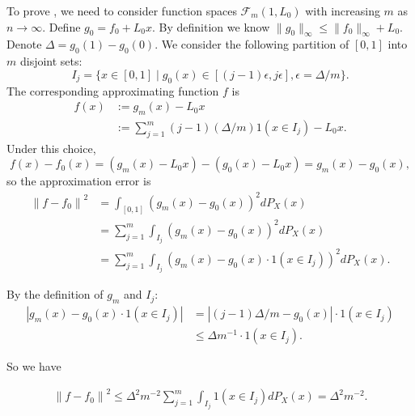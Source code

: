 \documentclass[12pt]{article}
\begin{document}
\begin{appendices}
To prove , we need to consider function spaces $\mathcal{F}_m(1, L_0)$ with increasing $m$ as $n\rightarrow\infty$. Define $g_0 = f_0 + L_0x$. By definition we know $\|g_0\|_\infty \leq \|f_0\|_{\infty} + L_0$. Denote $\Delta = g_{0}(1)-g_{0}(0)$. We consider the following partition of $[0,1]$ into $m$ disjoint sets:
\begin{equation*}
    I_j = \{ x\in[0,1] \mid g_0(x) \in [(j-1) \epsilon, j \epsilon], \epsilon = \Delta/m\}.
\end{equation*}
The corresponding approximating function $f$ is 
\begin{equation*}
\begin{aligned}
    f(x) & := g_m (x) - L_0 x\\
 & := \sum_{j=1}^m(j-1) (\Delta/m) 1\left(x \in I_j\right) - L_0 x .
\end{aligned}
\end{equation*}
Under this choice, 
\begin{equation*}
    f(x) - f_0(x) = (g_m(x) - L_0 x) - (g_0(x) - L_0 x) = g_m(x) - g_0(x),
\end{equation*}
so the approximation error is
\begin{equation*}
    \begin{aligned}
        \left\|f-f_0\right\|^2 &= \int_{[0,1]} (g_m(x) - g_0(x))^2 dP_X(x)\\
        & = \sum_{j=1}^m \int_{I_j} (g_m(x) - g_0(x))^2 dP_X(x)\\
        & = \sum_{j=1}^m \int_{I_j} (g_m(x) - g_0(x)\cdot 1(x \in I_j))^2 dP_X(x).
    \end{aligned}
\end{equation*}

By the definition of $g_m$ and $I_j$:
\begin{equation*}
    \begin{aligned}
        |g_m(x) - g_0(x) \cdot 1(x \in I_j)|
        & = |(j-1)\Delta/m - g_0(x)| \cdot 1(x \in I_j)\\
        & \leq \Delta m^{-1}\cdot 1(x \in I_j).
    \end{aligned}
\end{equation*}

So we have 

\begin{equation*}
    \begin{aligned}
        \left\|f-f_0\right\|^2 \leq \Delta^2 m^{-2} \sum_{j=1}^m \int_{I_j} 1(x\in I_j) dP_X(x) = \Delta^2 m^{-2}.
    \end{aligned}
\end{equation*}


\end{appendices}
\end{document}
